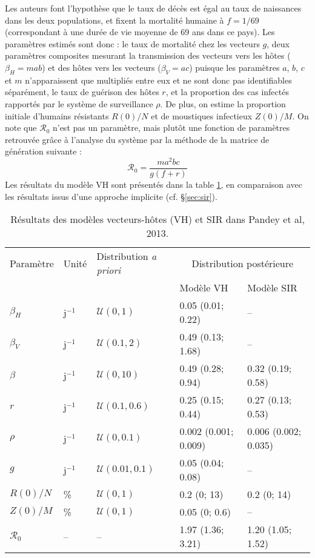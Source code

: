 Les auteurs font l'hypothèse que le taux de décès est égal au taux de naissances dans les deux populations, et fixent la mortalité humaine à $f=1/69$ (correspondant à une durée de vie moyenne de 69 ans dans ce pays).
Les paramètres estimés sont donc : le taux de mortalité chez les vecteurs $g$, deux paramètres composites mesurant la transmission des vecteurs vers les hôtes ($\beta_H=mab$) et des hôtes vers les vecteurs ($\beta_V=ac$) puisque les paramètres $a$, $b$, $c$ et $m$ n'apparaissent que multipliés entre eux et ne sont donc pas identifiables séparément, le taux de guérison des hôtes $r$, et la proportion des cas infectés rapportés par le système de surveillance $\rho$.
De plus, on estime la proportion initiale d'humains résistants $R(0)/N$ et de moustiques infectieux $Z(0)/M$.
On note que $\mathcal{R}_0$ n'est pas un paramètre, mais plutôt une fonction de paramètres retrouvée grâce à l'analyse du système par la méthode de la matrice de génération suivante :
\begin{equation}
\mathcal{R}_0 = \frac{ma^2bc}{g(f+r)}
\end{equation}
Les résultats du modèle VH sont présentés dans la table \ref{table:pandeyres}, en comparaison avec les résultats issus d'une approche implicite (cf. \S \ref{sec:sir}).

\begin{table}[h]
\centering
\caption{Résultats des modèles vecteurs-hôtes (VH) et SIR dans Pandey et al, 2013. \vspace{.5em}}
\label{table:pandeyres}
\begin{tabular}{lllll}
\hline 
Paramètre & Unité & Distribution {\em a priori} &\multicolumn{2}{c}{Distribution postérieure}\\ 
&&& Modèle VH & Modèle SIR \\
\hline
$\beta_H$ 	& j$^{-1}$ & $\mathcal{U}(0,1)$ 		& 0.05 (0.01; 0.22) & -- \\
$\beta_V$ 	& j$^{-1}$ & $\mathcal{U}(0.1,2)$ 		& 0.49 (0.13; 1.68) & -- \\
$\beta$ 	& j$^{-1}$ & $\mathcal{U}(0,10)$ 		& 0.49 (0.28; 0.94) & 0.32 (0.19; 0.58) \\
$r$ 		& j$^{-1}$ & $\mathcal{U}(0.1,0.6)$ 		& 0.25 (0.15; 0.44) & 0.27 (0.13; 0.53)\\
$\rho$ 		& j$^{-1}$ & $\mathcal{U}(0,0.1)$ 		& 0.002 (0.001; 0.009) & 0.006 (0.002; 0.035) \\
$g$ 		& j$^{-1}$ & $\mathcal{U}(0.01,0.1)$ 		& 0.05 (0.04; 0.08) & -- \\
$R(0)/N$ 	& \% & $\mathcal{U}(0,1)$ 		& 0.2 (0; 13) & 0.2 (0; 14)\\
$Z(0)/M$ 	& \% & $\mathcal{U}(0,1)$ 		& 0.05 (0; 0.6) & -- \\
$\mathcal{R}_0$ & -- & --		 		& 1.97 (1.36; 3.21) & 1.20 (1.05; 1.52)\\
\hline 
\end{tabular} 
\end{table}







